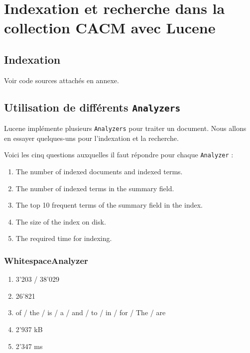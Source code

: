 \chapter{Indexation et recherche dans la collection CACM avec Lucene}

\section{Indexation}

Voir code sources attachés en annexe.

\section{Utilisation de différents \texttt{Analyzers}}

Lucene implémente plusieurs \texttt{Analyzers} pour traiter un document. Nous allons en essayer quelques-uns pour l'indexation et la recherche.

Voici les cinq questions auxquelles il faut répondre pour chaque \texttt{Analyzer} :

\begin{enumerate}
    \item The number of indexed documents and indexed terms.
    \item The number of indexed terms in the summary field.
    \item The top 10 frequent terms of the summary field in the index.
    \item The size of the index on disk.
    \item The required time for indexing.
\end{enumerate}

\subsection{WhitespaceAnalyzer}
\begin{enumerate}
    \item 3'203 / 38'029
    \item 26'821
    \item of / the / is / a / and / to / in / for / The / are
    \item 2'937 kB
    \item 2'347 ms
\end{enumerate}


